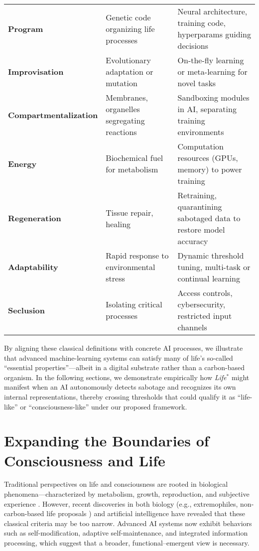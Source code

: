 \documentclass[12pt]{article}
\begin{document}
\begin{table}[!h]
{\begin{tabular}{l p{4.5cm} p{8.2cm}}
\hline
\textbf{Program} & Genetic code organizing life processes & Neural architecture, training code, hyperparams guiding decisions \\
\textbf{Improvisation} & Evolutionary adaptation or mutation & On-the-fly learning or meta-learning for novel tasks \\
\textbf{Compartmentalization} & Membranes, organelles segregating reactions & Sandboxing modules in AI, separating training environments \\
\textbf{Energy} & Biochemical fuel for metabolism & Computation resources (GPUs, memory) to power training \\
\textbf{Regeneration} & Tissue repair, healing & Retraining, quarantining sabotaged data to restore model accuracy \\
\textbf{Adaptability} & Rapid response to environmental stress & Dynamic threshold tuning, multi-task or continual learning \\
\textbf{Seclusion} & Isolating critical processes & Access controls, cybersecurity, restricted input channels \\
\hline
\end{tabular}
} %
\end{table}

\noindent
By aligning these classical definitions with concrete AI processes, we illustrate
that advanced machine-learning systems can satisfy many of life’s so-called
“essential properties”---albeit in a digital substrate rather than a
carbon-based organism. In the following sections, we demonstrate empirically how
\emph{Life\texorpdfstring{$^*$}{\^{}*}} might manifest when an AI autonomously
detects sabotage and recognizes its own internal representations, thereby
crossing thresholds that could qualify it as ``life-like'' or
``consciousness-like'' under our proposed framework.


\section{Expanding the Boundaries of Consciousness and Life}
\label{sec:expanding_boundaries}

Traditional perspectives on life and consciousness are rooted in biological phenomena—characterized by metabolism, growth, reproduction, and subjective experience \cite{Kasting1997,Rothschild2001,Nagel1974}. However, recent discoveries in both biology (e.g., extremophiles, non-carbon-based life proposals \cite{Lovley2003,Davies2010}) and artificial intelligence have revealed that these classical criteria may be too narrow. Advanced AI systems now exhibit behaviors such as self-modification, adaptive self-maintenance, and integrated information processing, which suggest that a broader, functional–emergent view is necessary.
\end{document}
